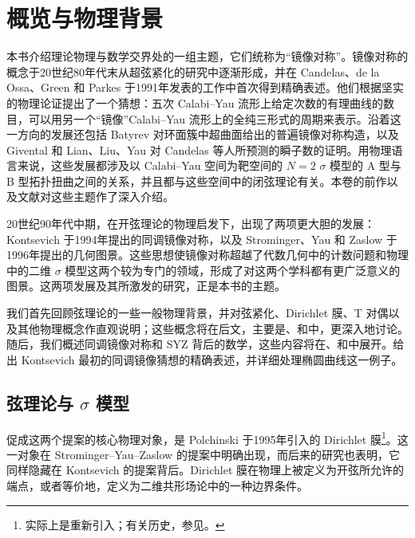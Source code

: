 \chapter{概览与物理背景}\label{chap:1}

本书介绍理论物理与数学交界处的一组主题，它们统称为“镜像对称”。镜像对称的概念于20世纪80年代末从超弦紧化的研究中逐渐形成，并在 Candelas、de la Ossa、Green 和 Parkes 于1991年发表的工作中首次得到精确表述。他们根据坚实的物理论证提出了一个猜想：五次 Calabi--Yau 流形上给定次数的有理曲线的数目，可以用另一个“镜像”Calabi--Yau 流形上的全纯三形式的周期来表示。沿着这一方向的发展还包括 Batyrev 对环面簇中超曲面给出的普遍镜像对称构造，以及 Givental 和 Lian、Liu、Yau 对 Candelas 等人所预测的瞬子数的证明。用物理语言来说，这些发展都涉及以 Calabi--Yau 空间为靶空间的 $N=2$ $\sigma$ 模型的 A 型与 B 型拓扑扭曲之间的关系，并且都与这些空间中的闭弦理论有关。本卷的前作以及文献对这些主题作了深入介绍。

20世纪90年代中期，在开弦理论的物理启发下，出现了两项更大胆的发展：Kontsevich 于1994年提出的同调镜像对称，以及 Strominger、Yau 和 Zaslow 于1996年提出的几何图景。这些思想使镜像对称超越了代数几何中的计数问题和物理中的二维 $\sigma$ 模型这两个较为专门的领域，形成了对这两个学科都有更广泛意义的图景。这两项发展及其所激发的研究，正是本书的主题。

我们首先回顾弦理论的一些一般物理背景，并对弦紧化、Dirichlet 膜、T 对偶以及其他物理概念作直观说明；这些概念将在后文，主要是、和中，更深入地讨论。随后，我们概述同调镜像对称和 SYZ 背后的数学，这些内容将在、和中展开。给出 Kontsevich 最初的同调镜像猜想的精确表述，并详细处理椭圆曲线这一例子。

\section{弦理论与 \texorpdfstring{$\sigma$}{σ} 模型}\label{sec:1.1}

促成这两个提案的核心物理对象，是 Polchinski 于1995年引入的 Dirichlet 膜\footnote{实际上是重新引入；有关历史，参见。}。这一对象在 Strominger--Yau--Zaslow 的提案中明确出现，而后来的研究也表明，它同样隐藏在 Kontsevich 的提案背后。Dirichlet 膜在物理上被定义为开弦所允许的端点，或者等价地，定义为二维共形场论中的一种边界条件。

